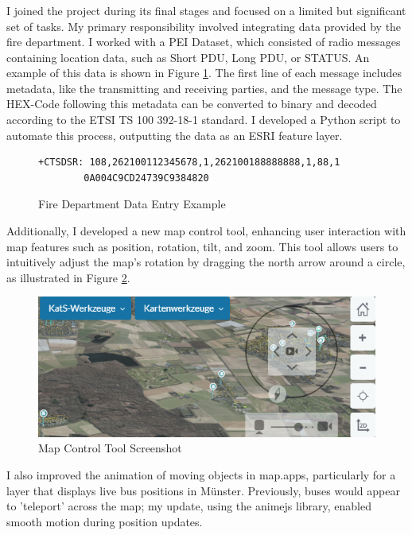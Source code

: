 \documentclass[11pt, titlepage, a4paper]{article}
\begin{document}
\subsubsection{}
I joined the project during its final stages and focused on a limited but significant set of tasks. My primary responsibility involved integrating data provided by the fire department. I worked with a PEI Dataset, which consisted of radio messages containing location data, such as Short PDU, Long PDU, or STATUS. An example of this data is shown in Figure \ref{fig:pei}. The first line of each message includes metadata, like the transmitting and receiving parties, and the message type. The HEX-Code following this metadata can be converted to binary and decoded according to the ETSI TS 100 392-18-1 standard. I developed a Python script to automate this process, outputting the data as an ESRI feature layer.

\begin{figure}[H]
    \caption{Fire Department Data Entry Example}
    \label{fig:pei}
    \begin{lstlisting}[frame=single]
        +CTSDSR: 108,262100112345678,1,262100188888888,1,88,1
        0A004C9CD24739C9384820
    \end{lstlisting}
    \centering
\end{figure}

Additionally, I developed a new map control tool, enhancing user interaction with map features such as position, rotation, tilt, and zoom. This tool allows users to intuitively adjust the map's rotation by dragging the north arrow around a circle, as illustrated in Figure \ref{fig:mapcontrol}.

\begin{figure}[H]
    \caption{Map Control Tool Screenshot}
    \label{fig:mapcontrol}
    \includegraphics[width=16cm]{dzgefahr_mapcontrol.png}
    \centering
\end{figure}

I also improved the animation of moving objects in map.apps, particularly for a layer that displays live bus positions in Münster. Previously, buses would appear to 'teleport' across the map; my update, using the animejs library, enabled smooth motion during position updates.
\end{document}
